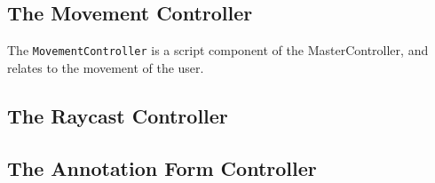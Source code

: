 
\subsection{The Movement Controller}
The \texttt{MovementController} is a script component of the MasterController, and relates to the movement of the user.


\subsection{The Raycast Controller}

\subsection{The Annotation Form Controller}

